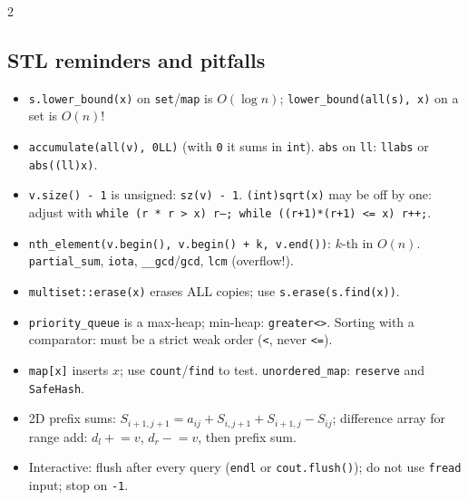 \documentclass[8pt,a4paper]{extarticle}
\begin{document}
\begin{multicols*}{2}
\subsection{STL reminders and pitfalls}
\begin{itemize}
\item \texttt{s.lower\_bound(x)} on \texttt{set}/\texttt{map} is $O(\log n)$;
  \texttt{lower\_bound(all(s), x)} on a set is $O(n)$!
\item \texttt{accumulate(all(v), 0LL)} (with \texttt{0} it sums in \texttt{int}).
  \texttt{abs} on \texttt{ll}: \texttt{llabs} or \texttt{abs((ll)x)}.
\item \texttt{v.size() - 1} is unsigned: \texttt{sz(v) - 1}. \texttt{(int)sqrt(x)} may be off by one:
  adjust with \texttt{while (r * r > x) r--; while ((r+1)*(r+1) <= x) r++;}.
\item \texttt{nth\_element(v.begin(), v.begin() + k, v.end())}: $k$-th in $O(n)$.
  \texttt{partial\_sum}, \texttt{iota}, \texttt{\_\_gcd}/\texttt{gcd}, \texttt{lcm} (overflow!).
\item \texttt{multiset::erase(x)} erases ALL copies; use \texttt{s.erase(s.find(x))}.
\item \texttt{priority\_queue} is a max-heap; min-heap: \texttt{greater<>}.
  Sorting with a comparator: must be a strict weak order (\texttt{<}, never \texttt{<=}).
\item \texttt{map[x]} inserts $x$; use \texttt{count}/\texttt{find} to test.
  \texttt{unordered\_map}: \texttt{reserve} and \texttt{SafeHash}.
\item 2D prefix sums: $S_{i+1,j+1} = a_{ij} + S_{i,j+1} + S_{i+1,j} - S_{ij}$;
  difference array for range add: $d_l \mathrel{+}= v$, $d_r \mathrel{-}= v$, then prefix sum.
\item Interactive: flush after every query (\texttt{endl} or \texttt{cout.flush()});
  do not use \texttt{fread} input; stop on \texttt{-1}.
\end{itemize}
\end{multicols*}
\end{document}
